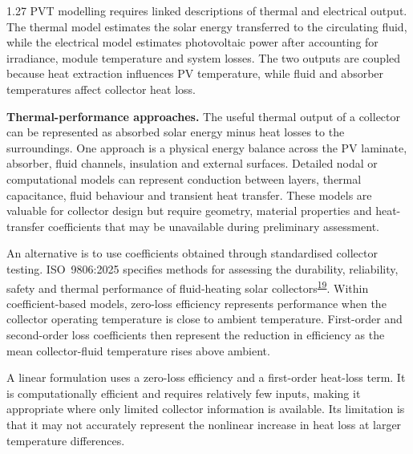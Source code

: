 \documentclass[12pt,letterpaper]{article}
\DeclareRobustCommand{\citenum}[1]{\hyperlink{ref:#1}{#1}} %
\begin{document}
\begin{spacing}{1.27}
PVT modelling requires linked descriptions of thermal and electrical output. The thermal model estimates the solar energy transferred to the circulating fluid, while the electrical model estimates photovoltaic power after accounting for irradiance, module temperature and system losses. The two outputs are coupled because heat extraction influences PV temperature, while fluid and absorber temperatures affect collector heat loss.\par

\vspace{0.15in}

\textbf{Thermal-performance approaches.} The useful thermal output of a collector can be represented as absorbed solar energy minus heat losses to the surroundings. One approach is a physical energy balance across the PV laminate, absorber, fluid channels, insulation and external surfaces. Detailed nodal or computational models can represent conduction between layers, thermal capacitance, fluid behaviour and transient heat transfer. These models are valuable for collector design but require geometry, material properties and heat-transfer coefficients that may be unavailable during preliminary assessment.\par

\vspace{0.15in}

An alternative is to use coefficients obtained through standardised collector testing. ISO~9806:2025 specifies methods for assessing the durability, reliability, safety and thermal performance of fluid-heating solar collectors\textsuperscript{\citenum{19}}. Within coefficient-based models, zero-loss efficiency represents performance when the collector operating temperature is close to ambient temperature. First-order and second-order loss coefficients then represent the reduction in efficiency as the mean collector-fluid temperature rises above ambient.\par

\vspace{0.15in}

A linear formulation uses a zero-loss efficiency and a first-order heat-loss term. It is computationally efficient and requires relatively few inputs, making it appropriate where only limited collector information is available. Its limitation is that it may not accurately represent the nonlinear increase in heat loss at larger temperature differences.\par


\end{spacing}
\end{document}
